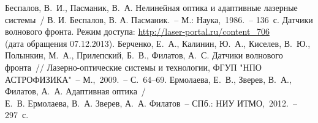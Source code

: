 \documentclass[pscyr]{hedwork}
\begin{document}
\pagebreak %
\renewcommand{\bibname}{Список литературы}

\begin{thebibliography}{9}
   Беспалов, В.~И., Пасманик, В.~А. Нелинейная оптика и адаптивные
    лазерные системы~/ В. И. Беспалов, В. А. Пасманик.~-- М.: Наука,~1986.~--
    136~с.
   Датчики волнового фронта. Режим доступа:
    \url{http://laser-portal.ru/content_706}\\
    (дата обращения 07.12.2013).
   Берченко, Е.~А., Калинин, Ю.~А., Киселев, В.~Ю., Полынкин, М.~А.,
    Прилепский, Б.~В., Филатов, А.~С. Датчики волнового фронта~//
    Лазерно-оптические системы и технологии, ФГУП "НПО АСТРОФИЗИКА"~--
    М.,~2009.~-- С.~64--69. 
   Ермолаева, Е.~В., Зверев, В.~А., Филатов, А.~А. Адаптивная
    оптика~/\\ Е.~В. Ермолаева, В.~А. Зверев, А.~А. Филатов~-- СПб.: НИУ
    ИТМО,~2012.~-- 297~с.
\end{thebibliography}
\end{document}
